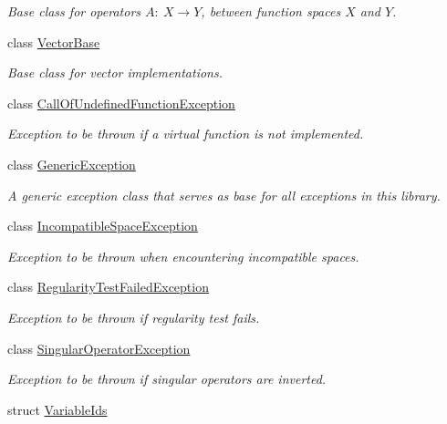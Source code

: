 \begin{DoxyCompactItemize}
\begin{DoxyCompactList}\small\item\em Base class for operators $A:\ X\rightarrow Y$, between function spaces $X$ and $Y$. \end{DoxyCompactList}\item 
class \hyperlink{classSpacy_1_1VectorBase}{Vector\-Base}
\begin{DoxyCompactList}\small\item\em Base class for vector implementations. \end{DoxyCompactList}\item 
class \hyperlink{classSpacy_1_1CallOfUndefinedFunctionException}{Call\-Of\-Undefined\-Function\-Exception}
\begin{DoxyCompactList}\small\item\em Exception to be thrown if a virtual function is not implemented. \end{DoxyCompactList}\item 
class \hyperlink{classSpacy_1_1GenericException}{Generic\-Exception}
\begin{DoxyCompactList}\small\item\em A generic exception class that serves as base for all exceptions in this library. \end{DoxyCompactList}\item 
class \hyperlink{classSpacy_1_1IncompatibleSpaceException}{Incompatible\-Space\-Exception}
\begin{DoxyCompactList}\small\item\em Exception to be thrown when encountering incompatible spaces. \end{DoxyCompactList}\item 
class \hyperlink{classSpacy_1_1RegularityTestFailedException}{Regularity\-Test\-Failed\-Exception}
\begin{DoxyCompactList}\small\item\em Exception to be thrown if regularity test fails. \end{DoxyCompactList}\item 
class \hyperlink{classSpacy_1_1SingularOperatorException}{Singular\-Operator\-Exception}
\begin{DoxyCompactList}\small\item\em Exception to be thrown if singular operators are inverted. \end{DoxyCompactList}\item 
struct \hyperlink{structSpacy_1_1VariableIds}{Variable\-Ids}
\item 

\end{DoxyCompactItemize}
